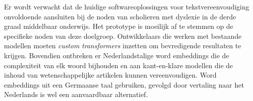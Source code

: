 
Er wordt verwacht dat de huidige softwareoplossingen voor tekstvereenvoudiging onvoldoende aansluiten bij de noden van scholieren met dyslexie in de derde graad middelbaar onderwijs. Het prototype is moeilijk af te stemmen op de specifieke noden van deze doelgroep. Ontwikkelaars die werken met bestaande modellen moeten \textit{custom transformers} inzetten om bevredigende resultaten te krijgen. Bovendien ontbreken er Nederlandstalige word embeddings die de complexiteit van elk woord bijhouden en aan kant-en-klare modellen die de inhoud van wetenschappelijke artikelen kunnen vereenvoudigen. Word embeddings uit een Germaanse taal gebruiken, gevolgd door vertaling naar het Nederlands is wel een aanvaardbaar alternatief. 


